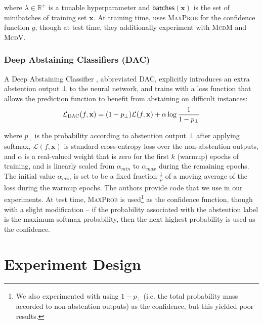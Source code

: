 \documentclass[11pt]{article}
\begin{document}
\noindent where $\lambda \in \mathbb{R}^+$ is a tunable hyperparameter and $\mathsf{batches}(\mathbf{x})$ is the set of minibatches of training set $\mathbf{x}$. At training time, \cite{xin-etal-2021-art} uses \textsc{MaxProb} for the confidence function $g$, though at test time, they additionally experiment with \textsc{McdM} and \textsc{McdV}.


\subsubsection*{Deep Abstaining Classifiers (\textsc{DAC})}


A Deep Abstaining Classifier \cite{thulasidasan2019combating}, abbreviated DAC, explicitly introduces an extra abstention output $\bot$ to the neural network, and trains with a loss function that allows the prediction function to benefit from abstaining on difficult instances:
\begin{equation*}
	\mathcal{L}_{\textsc{DAC}}(f, \mathbf{x}) = (1-p_\bot) \mathcal{L}(f, \mathbf{x}) + \alpha \log \frac{1}{1-p_\bot}
\end{equation*}

\noindent where $p_\bot$ is the probability according to abstention output $\bot$ after applying softmax, $\mathcal{L}(f, \mathbf{x})$ is standard cross-entropy loss over the non-abstention outputs, and $\alpha$ is a real-valued weight that is zero for the first $k$ (warmup) epochs of training, and is linearly scaled from $\alpha_{min}$ to $\alpha_{max}$ during the remaining epochs. The initial value $\alpha_{min}$ is set to be a fixed fraction $\frac{1}{\rho}$ of a moving average of the loss during the warmup epochs. The authors provide code that we use in our experiments. At test time, \textsc{MaxProb} is used\footnote{We also experimented with using $1-p_\bot$ (i.e. the total probability mass accorded to non-abstention outputs) as the confidence, but this yielded poor results.} as the confidence function, though with a slight modification -- if the probability associated with the abstention label is the maximum softmax probability, then the next highest probability is used as the confidence.

\section{Experiment Design}
\label{sec:expdesign}
\end{document}
